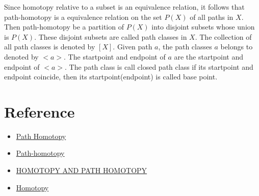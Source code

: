 Since homotopy relative to a subset is an equivalence relation, 
it follows that path-homotopy is a equivalence relation on the set $P(X)$ of all paths in $X$.
Then path-homotopy be a partition of $P(X)$ into
disjoint subsets whose union is $P(X)$. These disjoint subsets are called path classes in $X$.
The collection of all path classes is denoted by $[X]$.
Given path $a$, the path classes $a$ belongs to denoted by $<a>$.
The startpoint and endpoint of $a$ are the startpoint and endpoint of $<a>$.
The path class is call closed path class if its startpoint and endpoint coincide, 
then its startpoint(endpoint) is called base point.


\section{Reference}
\begin{itemize}
    \item \href{https://www.math.toronto.edu/~herzig/MAT327-lecturenotes21b.pdf}{Path Homotopy}
    \item \href{https://www.ms.uky.edu/~guillou/F17/551Notes-Week15.pdf}{Path-homotopy}
    \item \href{http://staff.ustc.edu.cn/~wangzuoq/Courses/21S-Topology/Notes/Lec18.pdf}{HOMOTOPY AND PATH HOMOTOPY}
    \item \href{https://pillowmath.github.io/Math%20142/Lec9.pdf}{Homotopy}
\end{itemize}